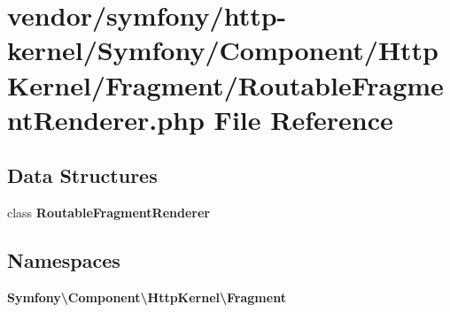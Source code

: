 \section{vendor/symfony/http-\/kernel/\+Symfony/\+Component/\+Http\+Kernel/\+Fragment/\+Routable\+Fragment\+Renderer.php File Reference}
\label{_routable_fragment_renderer_8php}
\subsection*{Data Structures}
\begin{DoxyCompactItemize}
\item 
class {\bf Routable\+Fragment\+Renderer}
\end{DoxyCompactItemize}
\subsection*{Namespaces}
\begin{DoxyCompactItemize}
\item 
 {\bf Symfony\textbackslash{}\+Component\textbackslash{}\+Http\+Kernel\textbackslash{}\+Fragment}
\end{DoxyCompactItemize}
